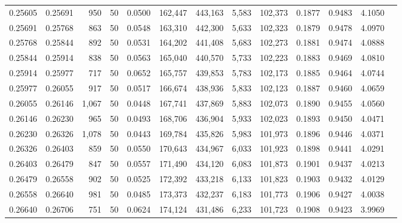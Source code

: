\begin{tabular}{rrrrrrrrrrrrr}
0.25605 & 0.25691 &   950 &  50 &                                     0.0500 & 162,447 & 443,163 &   5,583 & 102,373 & 0.1877 & 0.9483 & 4.1050 \\
0.25691 & 0.25768 &   863 &  50 &                                     0.0548 & 163,310 & 442,300 &   5,633 & 102,323 & 0.1879 & 0.9478 & 4.0970 \\
0.25768 & 0.25844 &   892 &  50 &                                     0.0531 & 164,202 & 441,408 &   5,683 & 102,273 & 0.1881 & 0.9474 & 4.0888 \\
0.25844 & 0.25914 &   838 &  50 &                                     0.0563 & 165,040 & 440,570 &   5,733 & 102,223 & 0.1883 & 0.9469 & 4.0810 \\
0.25914 & 0.25977 &   717 &  50 &                                     0.0652 & 165,757 & 439,853 &   5,783 & 102,173 & 0.1885 & 0.9464 & 4.0744 \\
0.25977 & 0.26055 &   917 &  50 &                                     0.0517 & 166,674 & 438,936 &   5,833 & 102,123 & 0.1887 & 0.9460 & 4.0659 \\
0.26055 & 0.26146 & 1,067 &  50 &                                     0.0448 & 167,741 & 437,869 &   5,883 & 102,073 & 0.1890 & 0.9455 & 4.0560 \\
0.26146 & 0.26230 &   965 &  50 &                                     0.0493 & 168,706 & 436,904 &   5,933 & 102,023 & 0.1893 & 0.9450 & 4.0471 \\
0.26230 & 0.26326 & 1,078 &  50 &                                     0.0443 & 169,784 & 435,826 &   5,983 & 101,973 & 0.1896 & 0.9446 & 4.0371 \\
0.26326 & 0.26403 &   859 &  50 &                                     0.0550 & 170,643 & 434,967 &   6,033 & 101,923 & 0.1898 & 0.9441 & 4.0291 \\
0.26403 & 0.26479 &   847 &  50 &                                     0.0557 & 171,490 & 434,120 &   6,083 & 101,873 & 0.1901 & 0.9437 & 4.0213 \\
0.26479 & 0.26558 &   902 &  50 &                                     0.0525 & 172,392 & 433,218 &   6,133 & 101,823 & 0.1903 & 0.9432 & 4.0129 \\
0.26558 & 0.26640 &   981 &  50 &                                     0.0485 & 173,373 & 432,237 &   6,183 & 101,773 & 0.1906 & 0.9427 & 4.0038 \\
0.26640 & 0.26706 &   751 &  50 &                                     0.0624 & 174,124 & 431,486 &   6,233 & 101,723 & 0.1908 & 0.9423 & 3.9969 \\

\end{tabular}
